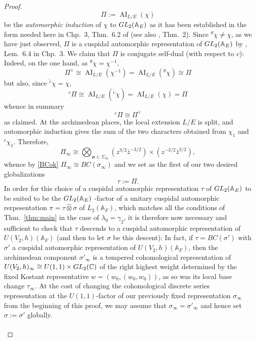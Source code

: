\documentclass[10pt,a4paper]{amsart}
\def\A{\mathbb A}
\def\C{\mathbb C}
\def\GL{{\rm GL}}
\def\ww{\mathsf w}
\begin{document}
\begin{proof}
$$
        \Pi:=\operatorname{AI}_{L/E}(\chi)
$$
be the {\it automorphic induction} of $\chi$ to \(\GL_2(\mathbb A_E)\) as it has been established in the form needed here in Chp.\ 3, Thm.\ 6.2 of \cite{arthur-clozel} (see also \cite{henniart12}, Thm.\ 2). Since ${}^\theta\chi\neq\chi$, as we have just observed, \(\Pi\) is a cuspidal automorphic representation of \(\GL_2(\mathbb A_E)\) by  \cite{arthur-clozel}, Lem.\ 6.4 in Chp.\ 3. We claim that $\Pi$ is conjugate self-dual (with respect to $c$): Indeed, on the one hand, as ${}^\theta\chi=\chi^{-1}$,
$$ \Pi^\vee
        \cong
        \operatorname{AI}_{L/E}(\chi^{-1})
        =
        \operatorname{AI}_{L/E}({}^\theta\chi)
        \cong
        \Pi$$
but also, since  \( {}^{\widetilde c}\chi=\chi\), 
$$
        {}^c\Pi
        \cong
        \operatorname{AI}_{L/E}({}^{\widetilde c}\chi)
        =
        \operatorname{AI}_{L/E}(\chi)
      =
        \Pi
$$
whence in summary
$$
        {}^c\Pi\cong\Pi^\vee
$$
as claimed. At the archimedean places, the local extension \(L/E\) is split, and
automorphic induction gives the sum of the two characters obtained from
\(\chi_1\) and \({}^c\chi_1\). Therefore,
$$
        \Pi_\infty\cong \bigotimes_{\ww\in\Sigma_\infty}
        \left(z^{3/2}\bar z^{-3/2}\right)
        \times
        \left(z^{-3/2}\bar z^{3/2}\right),
$$
whence by \eqref{BCok} $\Pi_\infty\cong BC(\sigma_\infty)$ and we set as the first of our two desired globalizations
$$
\tau:=\Pi.       
$$
In order for this choice of a cuspidal automorphic representation $\tau$ of \(\GL_2(\mathbb A_E)\) to be suited to be the \(\GL_2(\mathbb A_E)\) -factor of a unitary cuspidal automorphic rerpesentation $\pi=\tau\hat\otimes\sigma$ of $L_2(\A_F)$, which matches all the conditions of Thm.\ \ref{thm:main} in the case of $\lambda_0=\gamma_2$, it is therefore now necessary and sufficient to check that $\tau$ descends to a cuspidal automorphic representation of $U(V_2,h)(\A_F)$ (and then to let $\sigma$ be this descent): In fact, if $\tau=BC(\sigma')$ with $\sigma'$ a cuspidal automorphic representation of $U(V_2,h)(\A_F)$, then the archimedean component $\sigma'_\infty$ is a tempered cohomological representation of $U(V_2,h)_\infty\cong U(1,1)\times \GL_2(\C)$ of the right highest weight determined by the fixed Kostant representative $w=(w_0,(w_0,w_0))$, as so was its local base change $\tau_\infty$. At the cost of changing the cohomological discrete series representation at the $U(1,1)$-factor of our previously fixed representation $\sigma_\infty$ from the beginning of this proof, we may assume that $\sigma_\infty=\sigma'_\infty$ and hence set $\sigma:=\sigma'$ globally. \\\\ 

\end{proof}
\end{document}
